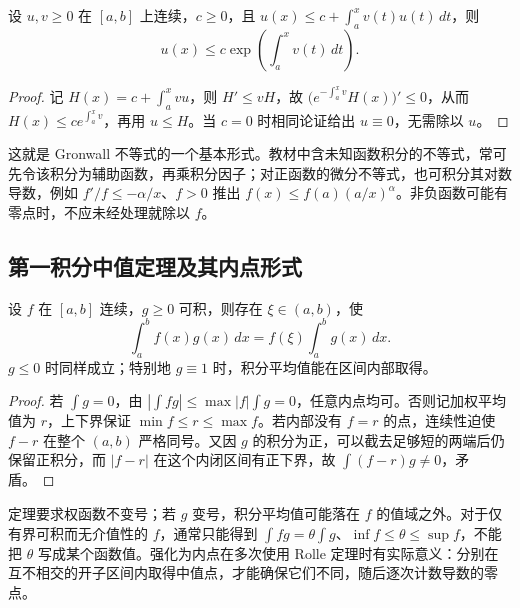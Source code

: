 \begin{proposition}
\label{prop:pei-int-gronwall}
设 $u,v\ge0$ 在 $[a,b]$ 上连续，$c\ge0$，且 $u(x)\le c+\int_a^xv(t)u(t)\,dt$，则
\[
 u(x)\le c\exp\left(\int_a^xv(t)\,dt\right).
\]
\end{proposition}
\begin{proof}
记 $H(x)=c+\int_a^xvu$，则 $H'\le vH$，故 $\bigl(e^{-\int_a^xv}H(x)\bigr)'\le0$，从而 $H(x)\le ce^{\int_a^xv}$，再用 $u\le H$。当 $c=0$ 时相同论证给出 $u\equiv0$，无需除以 $u$。
\end{proof}
这就是 Gronwall 不等式的一个基本形式。教材中含未知函数积分的不等式，常可先令该积分为辅助函数，再乘积分因子；对正函数的微分不等式，也可积分其对数导数，例如 $f'/f\le-\alpha/x$、$f>0$ 推出 $f(x)\le f(a)(a/x)^\alpha$。非负函数可能有零点时，不应未经处理就除以 $f$。

\subsection{第一积分中值定理及其内点形式}
\begin{theorem}
\label{thm:pei-int-first-mean}
设 $f$ 在 $[a,b]$ 连续，$g\ge0$ 可积，则存在 $\xi\in(a,b)$，使
\[
 \int_a^bf(x)g(x)\,dx=f(\xi)\int_a^bg(x)\,dx.
\]
$g\le0$ 时同样成立；特别地 $g\equiv1$ 时，积分平均值能在区间内部取得。
\end{theorem}
\begin{proof}
若 $\int g=0$，由 $|\int fg|\le\max|f|\int g=0$，任意内点均可。否则记加权平均值为 $r$，上下界保证 $\min f\le r\le\max f$。若内部没有 $f=r$ 的点，连续性迫使 $f-r$ 在整个 $(a,b)$ 严格同号。又因 $g$ 的积分为正，可以截去足够短的两端后仍保留正积分，而 $|f-r|$ 在这个内闭区间有正下界，故 $\int(f-r)g\ne0$，矛盾。
\end{proof}
定理要求权函数不变号；若 $g$ 变号，积分平均值可能落在 $f$ 的值域之外。对于仅有界可积而无介值性的 $f$，通常只能得到 $\int fg=\theta\int g$、$\inf f\le\theta\le\sup f$，不能把 $\theta$ 写成某个函数值。强化为内点在多次使用 Rolle 定理时有实际意义：分别在互不相交的开子区间内取得中值点，才能确保它们不同，随后逐次计数导数的零点。

